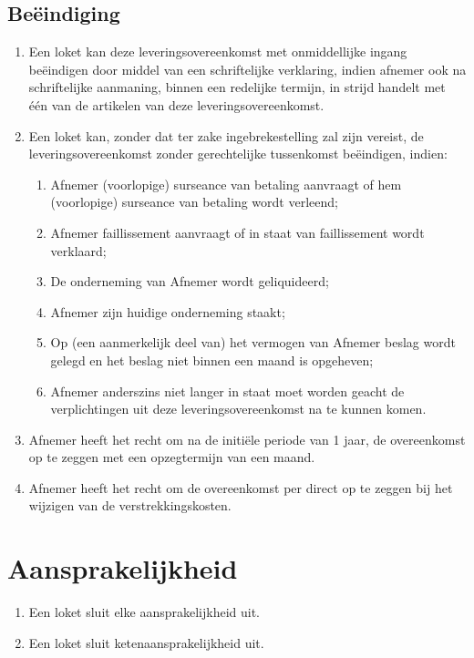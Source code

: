 \documentclass[10pt, a4paper]{article}
\begin{document}
\subsection*{Beëindiging}
\begin{enumerate}
   \item Een loket kan deze leveringsovereenkomst met onmiddellijke ingang beëindigen door middel van een schriftelijke verklaring, indien afnemer ook na schriftelijke aanmaning, binnen een redelijke termijn, in strijd handelt met één van de artikelen van deze leveringsovereenkomst.
   \item Een loket kan, zonder dat ter zake ingebrekestelling zal zijn vereist, de leveringsovereenkomst zonder gerechtelijke tussenkomst beëindigen, indien:
      \begin{enumerate}
      \item Afnemer (voorlopige) surseance van betaling aanvraagt of hem (voorlopige) surseance van betaling wordt verleend;
      \item Afnemer faillissement aanvraagt of in staat van faillissement wordt verklaard;
      \item De onderneming van Afnemer wordt geliquideerd;
      \item Afnemer zijn huidige onderneming staakt;
      \item Op (een aanmerkelijk deel van) het vermogen van Afnemer beslag wordt gelegd en het beslag niet binnen een maand is opgeheven;
      \item Afnemer anderszins niet langer in staat moet worden geacht de verplichtingen uit deze leveringsovereenkomst na te kunnen komen.
      \end{enumerate}
    \item Afnemer heeft het recht om na de initiële periode van 1 jaar, de overeenkomst op te zeggen met een opzegtermijn van een maand.
    \item Afnemer heeft het recht om de overeenkomst per direct op te zeggen bij het wijzigen van de verstrekkingskosten.
\end{enumerate}
\newpage


\section{Aansprakelijkheid}
\begin{enumerate}
   \item Een loket sluit elke aansprakelijkheid uit.
   \item Een loket sluit ketenaansprakelijkheid uit.
\end{enumerate}
\end{document}
